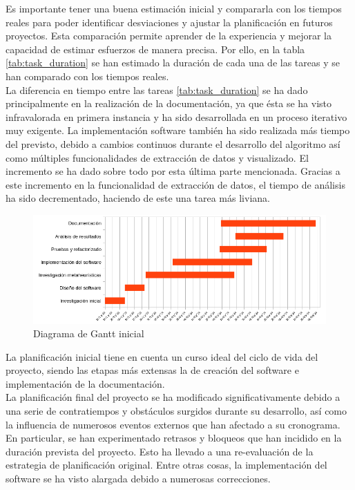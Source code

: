 Es importante tener una buena estimación inicial y compararla con los tiempos reales para poder identificar desviaciones y ajustar la planificación en futuros proyectos. Esta comparación permite aprender de la experiencia y mejorar la capacidad de estimar esfuerzos de manera precisa. Por ello, en la tabla \ref{tab:task_duration} se han estimado la duración de cada una de las tareas y se han comparado con los tiempos reales. \\[6pt]
La diferencia en tiempo entre las tareas \ref{tab:task_duration} se ha dado principalmente en la realización de la documentación, ya que ésta se ha visto infravalorada en primera instancia y ha sido desarrollada en un proceso iterativo muy exigente. La implementación software también ha sido realizada más tiempo del previsto, debido a cambios continuos durante el desarrollo del algoritmo así como múltiples funcionalidades de extracción de datos y visualizado. El incremento se ha dado sobre todo por esta última parte mencionada. Gracias a este incremento en la funcionalidad de extracción de datos, el tiempo de análisis ha sido decrementado, haciendo de este una tarea más liviana. 

\begin{figure}[htp]
      \begin{center}
            \includegraphics[width=1\textwidth]{imagenes/gantt-init.png}
      \end{center}
      \caption{Diagrama de Gantt inicial}
\end{figure}

La planificación inicial tiene en cuenta un curso ideal del ciclo de vida del proyecto, siendo las etapas más extensas la de creación del software e implementación de la documentación.\\[6pt]
La planificación final del proyecto se ha modificado significativamente debido a una serie de contratiempos y obstáculos surgidos durante su desarrollo, así como la influencia de numerosos eventos externos que han afectado a su cronograma. En particular, se han experimentado retrasos y bloqueos que han incidido en la duración prevista del proyecto. Esto ha llevado a una re-evaluación de la estrategia de planificación original. Entre otras cosas, la implementación del software se ha visto alargada debido a numerosas correcciones.

